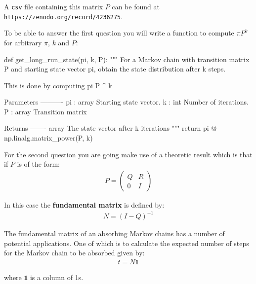 A \texttt{csv} file containing this matrix \(P\) can be found at
\texttt{https://zenodo.org/record/4236275}.


To be able to answer the first question you will write a function to compute \(\pi
P ^ k\) for arbitrary \(\pi\), \(k\) and \(P\):




\begin{pyin}
def get_long_run_state(pi, k, P):
    """
    For a Markov chain with transition matrix P and starting state vector pi,
    obtain the state distribution after k steps.

    This is done by computing pi P ^ k

    Parameters
    ----------
    pi : array
        Starting state vector.
    k : int
        Number of iterations.
    P : array
        Transition matrix

    Returns
    -------
    array
        The state vector after k iterations
    """
    return pi @ np.linalg.matrix_power(P, k)
\end{pyin}





For the second question you are going make use of a theoretic result which is
that if \(P\) is of the form:
\begin{equation*}
\begin{split}
P = \begin{pmatrix}
        Q & R \\
        0 & I
    \end{pmatrix}
\end{split}
\end{equation*}

In this case the \textbf{fundamental matrix} is defined by:
\begin{equation*}
\begin{split}
    N = (I - Q) ^ {- 1}
\end{split}
\end{equation*}

The fundamental matrix of an absorbing Markov chains has a number of potential
applications. One of which is to calculate
the expected number of steps for the Markov chain to be absorbed given by:
\begin{equation*}
\begin{split}
    t = N\mathbb{1}
\end{split}
\end{equation*}

where \(\mathbb{1}\) is a column of 1s.


